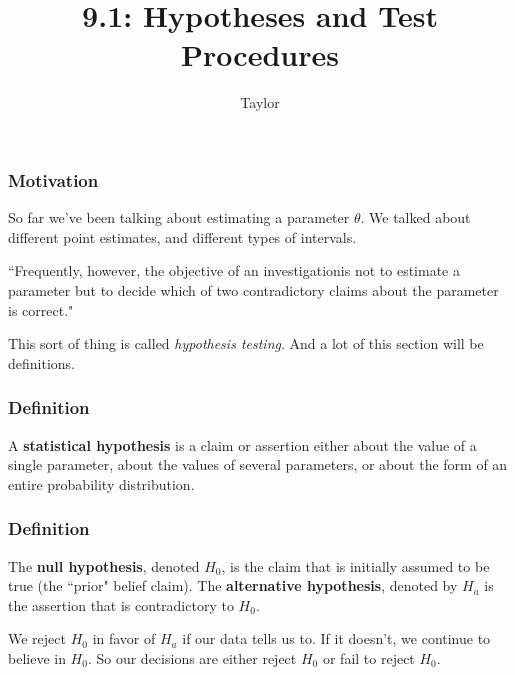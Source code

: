 \documentclass{beamer}
\title["9.1"]{9.1: Hypotheses and Test Procedures}
\author{Taylor}
\institute[UVA] 
{
University of Virginia \\
\medskip
\textit{} 
}
\date{}
\begin{document}

\begin{frame}
\titlepage 
\end{frame}

\begin{frame}
\frametitle{Motivation}

So far we've been talking about estimating a parameter $\theta$. We talked about different point estimates, and different types of intervals.
\newline

``Frequently, however, the objective of an investigationis not to estimate a parameter but to decide which of two contradictory claims about the parameter is correct."
\newline

This sort of thing is called \emph{hypothesis testing}. And a lot of this section will be definitions.

\end{frame}


\begin{frame}
\frametitle{Definition}

A \textbf{statistical hypothesis} is a claim or assertion either about the value of a single parameter, about the values of several parameters, or about the form of an entire probability distribution.

\end{frame}


\begin{frame}
\frametitle{Definition}

The \textbf{null hypothesis}, denoted $H_0$, is the claim that is initially assumed to be true (the ``prior" belief claim). The \textbf{alternative hypothesis}, denoted by $H_a$ is the assertion that is contradictory to $H_0$.
\newline

We reject $H_0$ in favor of $H_a$ if our data tells us to. If it doesn't, we continue to believe in $H_0$. So our decisions are either reject $H_0$ or fail to reject $H_0$.

\end{frame}
\end{document}
